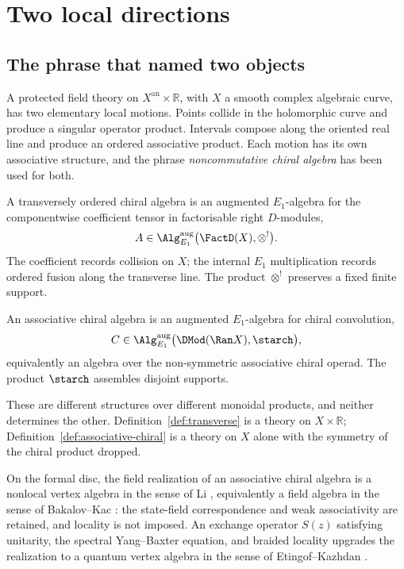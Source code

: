 \chapter{Two local directions}
\label{ch:two-directions}

\section{The phrase that named two objects}

A protected field theory on $X^{\mathrm{an}}\times\mathbb R$, with $X$ a
smooth complex algebraic curve, has two elementary local motions. Points
collide in the holomorphic curve and produce a singular operator product.
Intervals compose along the oriented real line and produce an ordered
associative product. Each motion has its own associative structure, and
the phrase \emph{noncommutative chiral algebra} has been used for both.

\begin{definition}
\label{def:transverse}
A transversely ordered chiral algebra is an augmented $E_1$-algebra for
the componentwise coefficient tensor in factorisable right $D$-modules,
\[
  A \in \Alg^{\mathrm{aug}}_{E_1}\bigl(\FactD(X), \otimes^!\bigr).
\]
The coefficient records collision on $X$; the internal $E_1$
multiplication records ordered fusion along the transverse line. The
product $\otimes^!$ preserves a fixed finite support.
\end{definition}

\begin{definition}
\label{def:associative-chiral}
An associative chiral algebra is an augmented $E_1$-algebra for chiral
convolution,
\[
  C \in \Alg^{\mathrm{aug}}_{E_1}\bigl(\DMod(\Ran X), \starch\bigr),
\]
equivalently an algebra over the non-symmetric associative chiral operad.
The product $\starch$ assembles disjoint supports.
\end{definition}

These are different structures over different monoidal products, and
neither determines the other. Definition~\ref{def:transverse} is a theory
on $X\times\mathbb R$; Definition~\ref{def:associative-chiral} is a
theory on $X$ alone with the symmetry of the chiral product dropped.

\begin{proposition}
\label{prop:nonlocal-va}
\StatusConditional{} On the formal disc, the field realization of an
associative chiral algebra is a nonlocal vertex algebra in the sense of
Li \cite{Li05}, equivalently a field algebra in the sense of
Bakalov--Kac \cite{BK03}: the state-field correspondence and weak
associativity are retained, and locality is not imposed. An exchange
operator $S(z)$ satisfying unitarity, the spectral Yang--Baxter equation,
and braided locality upgrades the realization to a quantum vertex algebra
in the sense of Etingof--Kazhdan \cite{EK00}.
\end{proposition}

